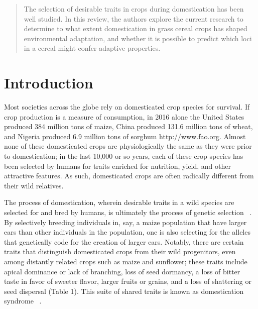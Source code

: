 \documentclass[12pt]{article}
\begin{document}
\maketitle

\begin{abstract}
The selection of desirable traits in crops during domestication has been well studied. In this review, the authors explore the current research to determine to what extent domestication in grass cereal crops has shaped environmental adaptation, and whether it is possible to predict which loci in a cereal might confer adaptive properties.
\end{abstract}

\section*{Introduction}
Most societies across the globe rely on domesticated crop species for survival.  If crop production is a measure of consumption, in 2016 alone the United States produced 384 million tons of maize, China produced 131.6 million tons of wheat, and Nigeria produced 6.9 million tons of sorghum http://www.fao.org. Almost none of these domesticated crops are physiologically the same as they were prior to domestication; in the last 10,000 or so years, each of these crop species has been selected by humans for traits enriched for nutrition, yield, and other attractive features. As such, domesticated crops are often radically different from their wild relatives.

The process of domestication, wherein desirable traits in a wild species are selected for and bred by humans, is ultimately the process of genetic selection ~\cite{Doebley2006}. By selectively breeding individuals in, say, a maize population that have larger ears than other individuals in the population, one is also selecting for the alleles that genetically code for the creation of larger ears.  Notably, there are certain traits that distinguish domesticated crops from their wild progenitors, even among distantly related crops such as maize and sunflower; these traits include apical dominance or lack of branching, loss of seed dormancy, a loss of bitter taste in favor of sweeter flavor, larger fruits or grains, and a loss of shattering or seed dispersal (Table 1). This suite of shared traits is known as domestication syndrome ~\cite{Hammer1984}. 
\end{document}
